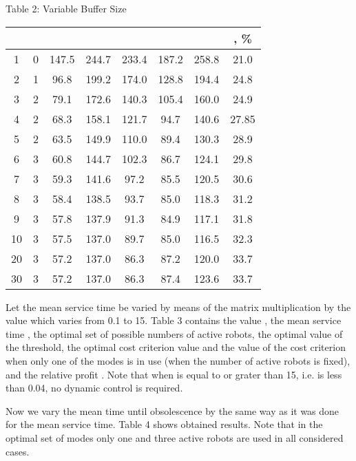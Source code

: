 \documentclass[11pt]{article}
\begin{document}
\newpage
\begin{center}
Table 2: Variable Buffer Size 
\\ \vspace{2mm}
\begin{tabular}{|c|c|c|c|c|c|c|c|}
  \hline
 &  &  &  &  &  &  & , \% \\
  \hline
  1 & 0 & 147.5& 244.7 & 233.4 & 187.2 & 258.8 & 21.0 \\
  2 & 1 & 96.8 & 199.2 & 174.0 & 128.8 & 194.4 & 24.8 \\
  3 & 2 & 79.1 & 172.6 & 140.3 & 105.4 & 160.0 & 24.9 \\
  4 & 2 & 68.3 & 158.1 & 121.7 & 94.7 & 140.6 & 27.85\\
  5 & 2 & 63.5 & 149.9 & 110.0 & 89.4 & 130.3 & 28.9 \\
  6 & 3 & 60.8 & 144.7 & 102.3 & 86.7 & 124.1 & 29.8 \\
  7 & 3 & 59.3 & 141.6 & 97.2 & 85.5 & 120.5 & 30.6 \\
  8 & 3 & 58.4 & 138.5 & 93.7 & 85.0 & 118.3 & 31.2 \\
  9 & 3 & 57.8 & 137.9 & 91.3 & 84.9 & 117.1 & 31.8\\
10 & 3  & 57.5 & 137.0 & 89.7 & 85.0 & 116.5 & 32.3 \\
20 & 3  & 57.2 & 137.0 & 86.3 & 87.2 & 120.0 & 33.7\\
30 & 3  & 57.2 & 137.0 & 86.3 & 87.4 & 123.6 & 33.7\\
  \hline
\end{tabular}\end{center}

\vspace{4mm}


Let the mean service time  be varied by means of the matrix 
multiplication by the value  which varies from 0.1 to 15. Table 3
contains the value , the mean service time , the optimal set
of possible numbers of active robots, the optimal value of the
threshold, the optimal cost criterion value and the value of the
cost criterion when only one of the modes is in use (when the number
of active robots is fixed), and the relative profit . Note that
when  is equal to or grater than 15, i.e.  is less than
0.04, no dynamic control is required.

Now we vary the mean time  until obsolescence by the same way
as it was done for the mean service time. Table 4 shows obtained
results. Note that in the optimal set of modes only one and three
active robots are used in all considered cases.
\end{document}
